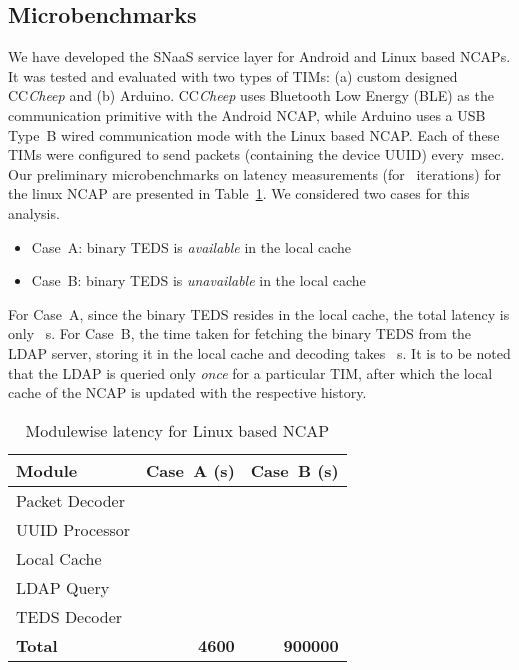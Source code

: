 \documentclass[conference]{IEEEtran}
\begin{document}
\subsection{Microbenchmarks}

We have developed the SNaaS service layer for Android and Linux based NCAPs.
It was tested and evaluated with two types of TIMs: (a) custom designed CC\emph{Cheep} and (b) Arduino.
CC\emph{Cheep} uses Bluetooth Low Energy (BLE) as the communication primitive with the Android NCAP, while Arduino uses a USB Type~B wired communication mode with the Linux based NCAP.
Each of these TIMs were configured to send packets (containing the device UUID) every \,msec.
\newline
\indent
Our preliminary microbenchmarks on latency measurements (for ~iterations) for the linux NCAP are presented in Table~\ref{tab:p1}. 
We considered two cases for this analysis.
\begin{itemize}
	\item Case~A: binary TEDS is \emph{available} in the local cache
	\item Case~B: binary TEDS is \emph{unavailable} in the local cache	
\end{itemize}
For Case~A, since the binary TEDS resides in the local cache, the total latency is only ~s.
For Case~B, the time taken for fetching the binary TEDS from the LDAP server, storing it in the local cache and decoding takes ~s. 
It is to be noted that the LDAP is queried only \emph{once} for a particular TIM, after which the local cache of the NCAP is updated with the respective history. 

\begin{table}[t]
\begin{center}
\caption {Modulewise latency for Linux based NCAP} 
\label{tab:p1}
\normalsize
\begin{tabular}{lrr}
\toprule
\textbf{Module}  &  \textbf{Case~A (s)}  &  \textbf{Case~B (s)}\\
\midrule
Packet Decoder &  &  \\ 
UUID Processor &  &  \\ 
Local Cache &   &   \\ 
LDAP Query &   &   \\ 
TEDS Decoder &    &   \\ 
\midrule
\textbf{Total} & \textbf{4600} & \textbf{900000} \\ 
\bottomrule
\end{tabular}
\end{center}
\vspace{5mm}
\end{table}
\end{document}
